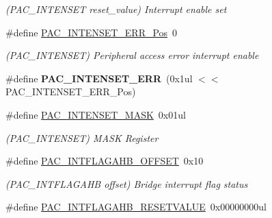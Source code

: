 \begin{DoxyCompactItemize}
\begin{DoxyCompactList}\small\item\em (P\+A\+C\+\_\+\+I\+N\+T\+E\+N\+S\+E\+T reset\+\_\+value) Interrupt enable set \end{DoxyCompactList}\item 
\hypertarget{group___s_a_m_l21___p_a_c_gab88efd740ff8813223ad6f542d9a9b21}{}\#define \hyperlink{group___s_a_m_l21___p_a_c_gab88efd740ff8813223ad6f542d9a9b21}{P\+A\+C\+\_\+\+I\+N\+T\+E\+N\+S\+E\+T\+\_\+\+E\+R\+R\+\_\+\+Pos}~0\label{group___s_a_m_l21___p_a_c_gab88efd740ff8813223ad6f542d9a9b21}

\begin{DoxyCompactList}\small\item\em (P\+A\+C\+\_\+\+I\+N\+T\+E\+N\+S\+E\+T) Peripheral access error interrupt enable \end{DoxyCompactList}\item 
\hypertarget{group___s_a_m_l21___p_a_c_gafc7f9c38b672accb9d0ef762bac56c85}{}\#define {\bfseries P\+A\+C\+\_\+\+I\+N\+T\+E\+N\+S\+E\+T\+\_\+\+E\+R\+R}~(0x1ul $<$$<$ P\+A\+C\+\_\+\+I\+N\+T\+E\+N\+S\+E\+T\+\_\+\+E\+R\+R\+\_\+\+Pos)\label{group___s_a_m_l21___p_a_c_gafc7f9c38b672accb9d0ef762bac56c85}

\item 
\hypertarget{group___s_a_m_l21___p_a_c_ga275044a43202e526e110b4df9bbcd57c}{}\#define \hyperlink{group___s_a_m_l21___p_a_c_ga275044a43202e526e110b4df9bbcd57c}{P\+A\+C\+\_\+\+I\+N\+T\+E\+N\+S\+E\+T\+\_\+\+M\+A\+S\+K}~0x01ul\label{group___s_a_m_l21___p_a_c_ga275044a43202e526e110b4df9bbcd57c}

\begin{DoxyCompactList}\small\item\em (P\+A\+C\+\_\+\+I\+N\+T\+E\+N\+S\+E\+T) M\+A\+S\+K Register \end{DoxyCompactList}\item 
\hypertarget{group___s_a_m_l21___p_a_c_ga83fa61fe80493623b4c03803a5868356}{}\#define \hyperlink{group___s_a_m_l21___p_a_c_ga83fa61fe80493623b4c03803a5868356}{P\+A\+C\+\_\+\+I\+N\+T\+F\+L\+A\+G\+A\+H\+B\+\_\+\+O\+F\+F\+S\+E\+T}~0x10\label{group___s_a_m_l21___p_a_c_ga83fa61fe80493623b4c03803a5868356}

\begin{DoxyCompactList}\small\item\em (P\+A\+C\+\_\+\+I\+N\+T\+F\+L\+A\+G\+A\+H\+B offset) Bridge interrupt flag status \end{DoxyCompactList}\item 
\hypertarget{group___s_a_m_l21___p_a_c_ga26d7f3826d7482e68af262319e44f4ed}{}\#define \hyperlink{group___s_a_m_l21___p_a_c_ga26d7f3826d7482e68af262319e44f4ed}{P\+A\+C\+\_\+\+I\+N\+T\+F\+L\+A\+G\+A\+H\+B\+\_\+\+R\+E\+S\+E\+T\+V\+A\+L\+U\+E}~0x00000000ul\label{group___s_a_m_l21___p_a_c_ga26d7f3826d7482e68af262319e44f4ed}


\end{DoxyCompactItemize}
